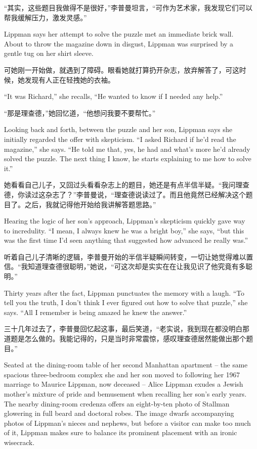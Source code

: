 \ifdefined\chs
``其实，这些题目我做得不是很好，''李普曼坦言，``可作为艺术家，我发现它们可以帮我缓解压力，激发灵感。''
\fi

\ifdefined\eng
Lippman says her attempt to solve the puzzle met an immediate brick wall. About to throw the magazine down in disgust, Lippman was surprised by a gentle tug on her shirt sleeve.
\fi

\ifdefined\chs
可她刚一开始做，就遇到了障碍。眼看她就打算扔开杂志，放弃解答了，可这时候，她发现有人正在轻拽她的衣袖。
\fi

\ifdefined\eng
``It was Richard,'' she recalls, ``He wanted to know if I needed any help.''
\fi

\ifdefined\chs
``那是理查德，''她回忆道，``他想问我要不要帮忙。''
\fi

\ifdefined\eng
Looking back and forth, between the puzzle and her son, Lippman says she initially regarded the offer with skepticism. ``I asked Richard if he'd read the magazine,'' she says. ``He told me that, yes, he had and what's more he'd already solved the puzzle. The next thing I know, he starts explaining to me how to solve it.''
\fi

\ifdefined\chs
她看看自己儿子，又回过头看看杂志上的题目，她还是有点半信半疑。``我问理查德，你读过这杂志了？''李普曼说，``理查德说读过了。而且他竟然已经解决这个题目了。之后，我就记得他开始给我讲解答题思路。''
\fi

\ifdefined\eng
Hearing the logic of her son's approach, Lippman's skepticism quickly gave way to incredulity. ``I mean, I always knew he was a bright boy,'' she says, ``but this was the first time I'd seen anything that suggested how advanced he really was.''
\fi

\ifdefined\chs
听着自己儿子清晰的逻辑，李普曼开始的半信半疑瞬间转变，一切让她觉得难以置信。``我知道理查德很聪明，''她说，``可这次却是实实在在让我见识了他究竟有多聪明。''
\fi

\ifdefined\eng
Thirty years after the fact, Lippman punctuates the memory with a laugh. ``To tell you the truth, I don't think I ever figured out how to solve that puzzle,'' she says. ``All I remember is being amazed he knew the answer.''
\fi

\ifdefined\chs
三十几年过去了，李普曼回忆起这事，最后笑道，``老实说，我到现在都没明白那道题是怎么做的。我能记得的，只是当时非常震惊，感叹理查德居然能做出那个题目。''
\fi

\ifdefined\eng
Seated at the dining-room table of her second Manhattan apartment -- the same spacious three-bedroom complex she and her son moved to following her 1967 marriage to Maurice Lippman, now deceased -- Alice Lippman exudes a Jewish mother's mixture of pride and bemusement when recalling her son's early years. The nearby dining-room credenza offers an eight-by-ten photo of Stallman glowering in full beard and doctoral robes. The image dwarfs accompanying photos of Lippman's nieces and nephews, but before a visitor can make too much of it, Lippman makes sure to balance its prominent placement with an ironic wisecrack.
\fi

